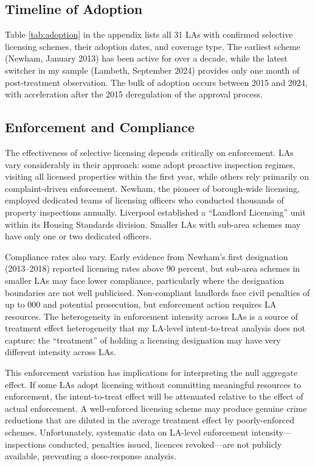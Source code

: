 \documentclass[12pt]{article}
\begin{document}
\subsection{Timeline of Adoption}

Table \ref{tab:adoption} in the appendix lists all 31 LAs with confirmed selective licensing schemes, their adoption dates, and coverage type. The earliest scheme (Newham, January 2013) has been active for over a decade, while the latest switcher in my sample (Lambeth, September 2024) provides only one month of post-treatment observation. The bulk of adoption occurs between 2015 and 2024, with acceleration after the 2015 deregulation of the approval process.

\subsection{Enforcement and Compliance}

The effectiveness of selective licensing depends critically on enforcement. LAs vary considerably in their approach: some adopt proactive inspection regimes, visiting all licensed properties within the first year, while others rely primarily on complaint-driven enforcement. Newham, the pioneer of borough-wide licensing, employed dedicated teams of licensing officers who conducted thousands of property inspections annually. Liverpool established a ``Landlord Licensing'' unit within its Housing Standards division. Smaller LAs with sub-area schemes may have only one or two dedicated officers.

Compliance rates also vary. Early evidence from Newham's first designation (2013--2018) reported licensing rates above 90 percent, but sub-area schemes in smaller LAs may face lower compliance, particularly where the designation boundaries are not well publicised. Non-compliant landlords face civil penalties of up to 000 and potential prosecution, but enforcement action requires LA resources. The heterogeneity in enforcement intensity across LAs is a source of treatment effect heterogeneity that my LA-level intent-to-treat analysis does not capture: the ``treatment'' of holding a licensing designation may have very different intensity across LAs.

This enforcement variation has implications for interpreting the null aggregate effect. If some LAs adopt licensing without committing meaningful resources to enforcement, the intent-to-treat effect will be attenuated relative to the effect of actual enforcement. A well-enforced licensing scheme may produce genuine crime reductions that are diluted in the average treatment effect by poorly-enforced schemes. Unfortunately, systematic data on LA-level enforcement intensity---inspections conducted, penalties issued, licences revoked---are not publicly available, preventing a dose-response analysis.
\end{document}
